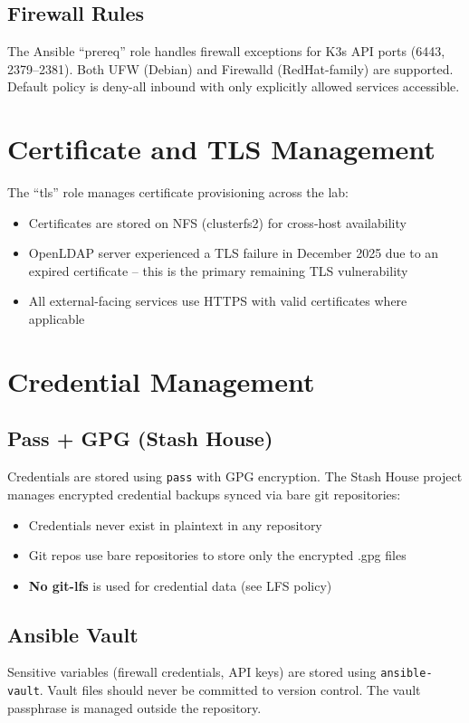 \subsection{Firewall Rules}
The Ansible ``prereq'' role handles firewall exceptions for K3s API ports (6443, 2379--2381). Both UFW (Debian) and Firewalld (RedHat-family) are supported. Default policy is deny-all inbound with only explicitly allowed services accessible.

\section{Certificate and TLS Management}
The ``tls'' role manages certificate provisioning across the lab:
\begin{itemize}
  \item Certificates are stored on NFS (clusterfs2) for cross-host availability
  \item OpenLDAP server experienced a TLS failure in December 2025 due to an expired certificate -- this is the primary remaining TLS vulnerability
  \item All external-facing services use HTTPS with valid certificates where applicable
\end{itemize}

\section{Credential Management}

\subsection{Pass + GPG (Stash House)}
Credentials are stored using \texttt{pass} with GPG encryption. The Stash House project manages encrypted credential backups synced via bare git repositories:
\begin{itemize}
  \item Credentials never exist in plaintext in any repository
  \item Git repos use bare repositories to store only the encrypted .gpg files
  \item \textbf{No git-lfs} is used for credential data (see LFS policy)
\end{itemize}

\subsection{Ansible Vault}
Sensitive variables (firewall credentials, API keys) are stored using \texttt{ansible-vault}. Vault files should never be committed to version control. The vault passphrase is managed outside the repository.


